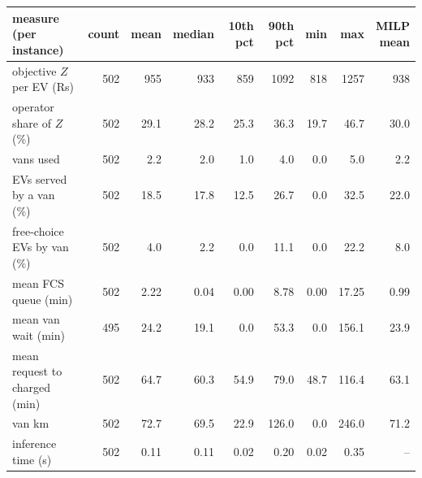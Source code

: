 \begin{tabular}{@{}lrrrrrrrr@{}}
\toprule
measure (per instance) & count & mean & median & 10th pct & 90th pct & min & max & \shortstack[r]{MILP\\mean} \\
\midrule
objective $Z$ per EV (Rs) & 502 & 955 & 933 & 859 & 1092 & 818 & 1257 & 938 \\
operator share of $Z$ (\%) & 502 & 29.1 & 28.2 & 25.3 & 36.3 & 19.7 & 46.7 & 30.0 \\
vans used & 502 & 2.2 & 2.0 & 1.0 & 4.0 & 0.0 & 5.0 & 2.2 \\
EVs served by a van (\%) & 502 & 18.5 & 17.8 & 12.5 & 26.7 & 0.0 & 32.5 & 22.0 \\
free-choice EVs by van (\%) & 502 & 4.0 & 2.2 & 0.0 & 11.1 & 0.0 & 22.2 & 8.0 \\
mean FCS queue (min) & 502 & 2.22 & 0.04 & 0.00 & 8.78 & 0.00 & 17.25 & 0.99 \\
mean van wait (min) & 495 & 24.2 & 19.1 & 0.0 & 53.3 & 0.0 & 156.1 & 23.9 \\
mean request to charged (min) & 502 & 64.7 & 60.3 & 54.9 & 79.0 & 48.7 & 116.4 & 63.1 \\
van km & 502 & 72.7 & 69.5 & 22.9 & 126.0 & 0.0 & 246.0 & 71.2 \\
inference time (s) & 502 & 0.11 & 0.11 & 0.02 & 0.20 & 0.02 & 0.35 & -- \\
\bottomrule
\end{tabular}
